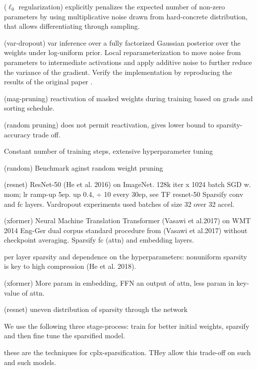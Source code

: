 ($\ell_0$ regularization) explicitly penalizes the expected number of non-zero parameters
by using multiplicative noise drawn from hard-concrete distribution, that allows differentiating
through sampling.

(var-dropout) var inference over a fully factorized Gaussian posterior over the weights under
log-uniform prior. Local reparameterization to move noise from parameters to intermediate activations
and apply additive noise to further reduce the variance of the gradient. Verify the implementation
by reproducing the results of the original paper \citep{molchanovetal2017}.

(mag-pruning) reactivation of masked weights during training based on grads and sorting schedule.

(random pruning) does not permit reactivation, gives lower bound to sparsity-accuracy trade off.

Constant number of training steps, extensive hyperparameter tuning

(random) Benchmark aginst random weight pruning

(resnet) ResNet-50 (He et al. 2016) on ImageNet. 128k iter x 1024 batch 
SGD w. mom; lr ramp-up 5ep. up 0.4, ÷ 10 every 30ep, see TF resnet-50
Sparsify conv and fc layers. Vardropout experiments used batches of size 32 over 32 accel.

(xformer) Neural Machine Translation Transformer (Vasawi et al.2017) on WMT 2014 Eng-Ger dual corpus
standard procedure from (Vasawi et al.2017) without checkpoint averaging. Sparsify fc (attn) and
embedding layers.

per layer sparsity and dependence on the hyperparameters: nonuniform sparsity is key to
high compression (He et al. 2018).

(xformer) More param in embedding, FFN an output of attn, less param in key-value of attn.

(resnet) uneven distribution of sparsity through the network

We use the following three stage-process: train for better initial weights, sparsify
and then fine tune the sparsified model.

these are the techniques for cplx-sparsification. THey allow this trade-off on such and
such models.
